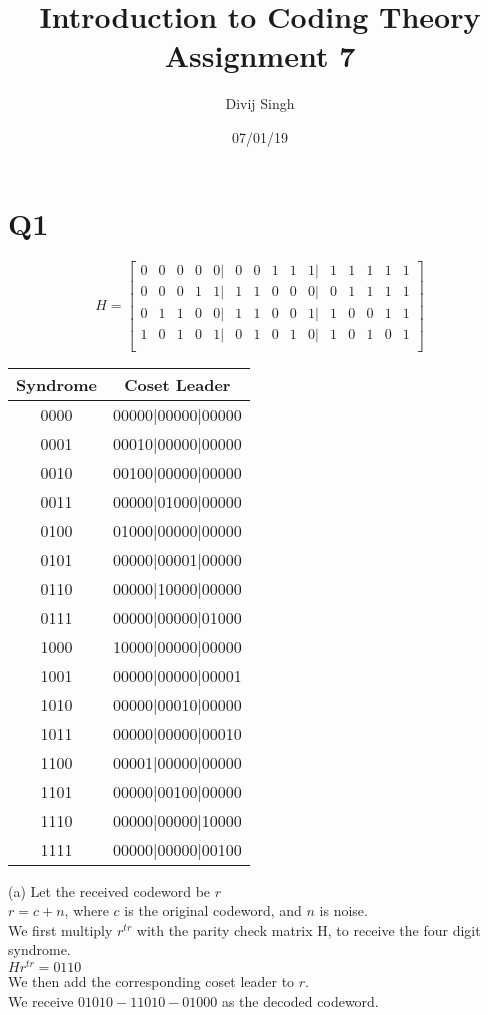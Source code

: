 \documentclass{article}
\title{Introduction to Coding Theory Assignment 7}
\author{Divij Singh}
\date{07/01/19}
\begin{document}
	\maketitle
	\section{Q1}
\[
H =
\begin{bmatrix}
0 & 0 & 0 & 0 & 0 |& 0 & 0 & 1 & 1 & 1 |& 1 & 1 & 1 & 1 & 1\\
0 & 0 & 0 & 1 & 1 |& 1 & 1 & 0 & 0 & 0 |& 0 & 1 & 1 & 1 & 1\\
0 & 1 & 1 & 0 & 0 |& 1 & 1 & 0 & 0 & 1 |& 1 & 0 & 0 & 1 & 1\\
1 & 0 & 1 & 0 & 1 |& 0 & 1 & 0 & 1 & 0 |& 1 & 0 & 1 & 0 & 1\\
\end{bmatrix}
\]
\begin{center}
\begin{tabular}{|c | c |}
\hline
Syndrome & Coset Leader\\
\hline
0000&00000|00000|00000\\
0001&00010|00000|00000\\
0010&00100|00000|00000\\
0011&00000|01000|00000\\
0100&01000|00000|00000\\
0101&00000|00001|00000\\
0110&00000|10000|00000\\
0111&00000|00000|01000\\
1000&10000|00000|00000\\
1001&00000|00000|00001\\
1010&00000|00010|00000\\
1011&00000|00000|00010\\
1100&00001|00000|00000\\
1101&00000|00100|00000\\
1110&00000|00000|10000\\
1111&00000|00000|00100\\
\hline
\end{tabular}
\end{center}
(a) Let the received codeword be $r$\\
$r = c + n$, where $c$ is the original codeword, and $n$ is noise.\\
We first multiply $r^{tr}$ with the parity check matrix H, to receive the four digit syndrome.\\
$Hr^{tr} =   0110$\\
We then add the corresponding coset leader to $r$.\\
We receive $01010-11010-01000$ as the decoded codeword.\\\\
\end{document}
